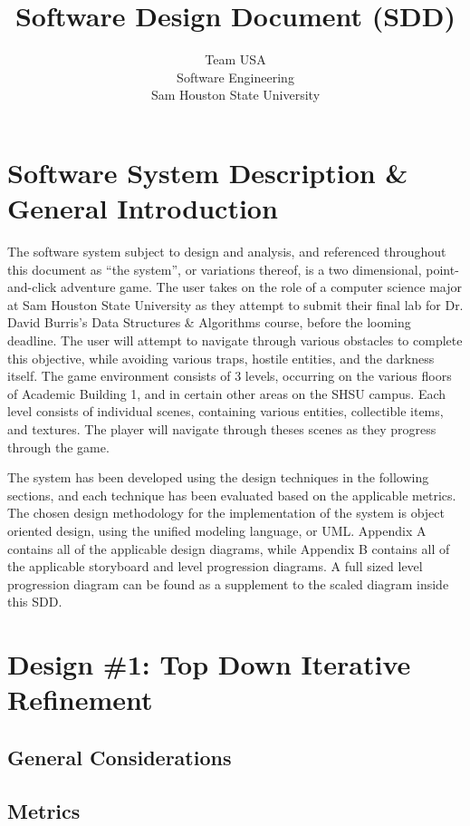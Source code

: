 \documentclass{article}
\title{Software Design Document (SDD)}
\author{Team USA \\ Software Engineering \\ Sam Houston State University}
\begin{document}
\maketitle
\newpage

\tableofcontents
\newpage

%
%
\section{Software System Description \& General Introduction}
The software system subject to design and analysis, and referenced throughout this document as ``the system'', or variations thereof, is a two dimensional, point-and-click adventure game. The user takes on the role of a computer science major at Sam Houston State University as they attempt to submit their final lab for Dr. David Burris's Data Structures \& Algorithms course, before the looming deadline. The user will attempt to navigate through various obstacles to complete this objective, while avoiding various traps, hostile entities, and the darkness itself. The game environment consists of 3 levels, occurring on the various floors of Academic Building 1, and in certain other areas on the SHSU campus. Each level consists of individual scenes, containing various entities, collectible items, and textures. The player will navigate through theses scenes as they progress through the game. 

The system has been developed using the design techniques in the following sections, and each technique has been evaluated based on the applicable metrics. The chosen design methodology for the implementation of the system is object oriented design, using the unified modeling language, or UML. Appendix A contains all of the applicable design diagrams, while Appendix B contains all of the applicable storyboard and level progression diagrams. A full sized level progression diagram can be found as a supplement to the scaled diagram inside this SDD. 
%
%
\section{Design \#1: Top Down Iterative Refinement}
	\subsection{General Considerations}
	\subsection{Metrics}
\end{document}
